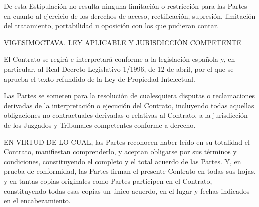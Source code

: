 \documentclass[a4paper,11pt]{report}
\begin{document}
De esta Estipulación no resulta ninguna limitación o restricción para
las Partes en cuanto al ejercicio de los derechos de acceso,
rectificación, supresión, limitación del tratamiento, portabilidad u
oposición con los que pudieran contar.

VIGESIMOCTAVA. LEY APLICABLE Y JURISDICCIÓN COMPETENTE

El Contrato se regirá e interpretará conforme a la legislación española
y, en particular, al Real Decreto Legislativo 1/1996, de 12 de abril,
por el que se aprueba el texto refundido de la Ley de Propiedad
Intelectual.

Las Partes se someten para la resolución de cualesquiera disputas o
reclamaciones derivadas de la interpretación o ejecución del Contrato,
incluyendo todas aquellas obligaciones no contractuales derivadas o
relativas al Contrato, a la jurisdicción de los Juzgados y Tribunales
competentes conforme a derecho.

EN VIRTUD DE LO CUAL, las Partes reconocen haber leído en su totalidad
el Contrato, manifiestan comprenderlo, y aceptan obligarse por sus
términos y condiciones, constituyendo el completo y el total acuerdo de
las Partes. Y, en prueba de conformidad, las Partes firman el presente
Contrato en todas sus hojas, y en tantas copias originales como Partes
participen en el Contrato, constituyendo todas esas copias un único
acuerdo, en el lugar y fechas indicados en el encabezamiento.
\end{document}
